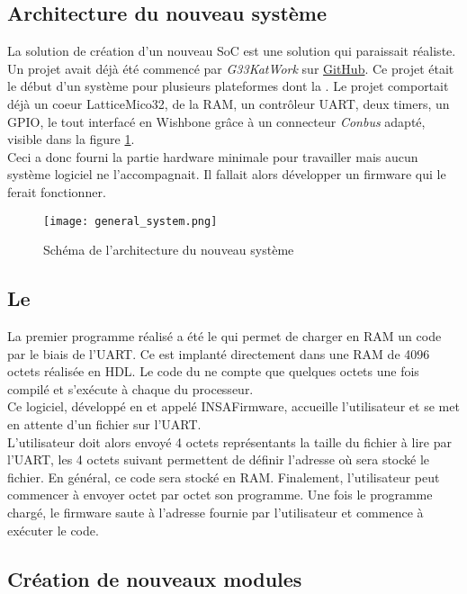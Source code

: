 \subsection{Architecture du nouveau système}

La solution de création d'un nouveau SoC est une solution qui paraissait réaliste. Un projet avait déjà été commencé par \textit{G33KatWork} sur \href{https://github.com}{GitHub}. Ce projet était le début d'un système pour plusieurs plateformes dont la \nexys{}. Le projet comportait déjà un coeur LatticeMico32, de la RAM, un contrôleur UART, deux timers, un GPIO, le tout interfacé en Wishbone grâce à un connecteur \textit{Conbus} adapté, visible dans la figure \ref{new-system}.\\
Ceci a donc fourni la partie hardware minimale pour travailler mais aucun système logiciel ne l'accompagnait. Il fallait alors développer un firmware qui le ferait fonctionner.

\begin{figure}[h!]
\centering
\texttt{[image: general\_system.png]}
\caption{Schéma de l'architecture du nouveau système}
\label{new-system}
\end{figure}

\subsection{Le }

La premier programme réalisé a été le  qui permet de charger en RAM un code par le biais de l'UART. Ce  est implanté directement dans une RAM de 4096 octets réalisée en HDL. Le code du  ne compte que quelques octets une fois compilé et s'exécute à chaque  du processeur.\\
Ce logiciel, développé en  et appelé INSAFirmware, accueille l'utilisateur et se met en attente d'un fichier sur l'UART.\\
L'utilisateur doit alors envoyé 4 octets représentants la taille du fichier à lire par l'UART, les 4 octets suivant permettent de définir l'adresse où sera stocké le fichier. En général, ce code sera stocké en RAM. Finalement, l'utilisateur peut commencer à envoyer octet par octet son programme. Une fois le programme chargé, le firmware saute à l'adresse fournie par l'utilisateur et commence à exécuter le code.

\subsection{Création de nouveaux modules}

